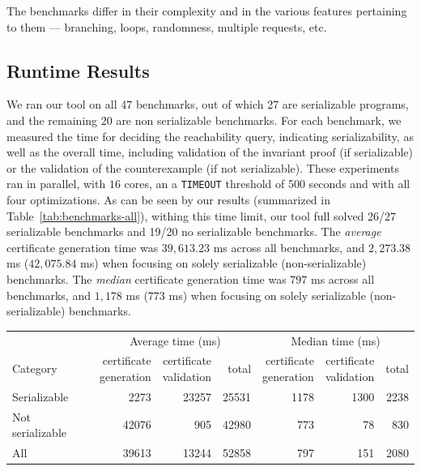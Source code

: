 The benchmarks differ in their complexity and in the various features pertaining to them --- branching, loops, randomness, multiple requests, etc. 
%

\subsection{Runtime Results}
We ran our tool on all 47 benchmarks, out of which 27 are serializable programs, and the remaining 20 are non serializable benchmarks. 
For each benchmark, we measured the time for deciding the reachability query, indicating serializability, as well as the overall time, including validation of the invariant proof (if serializable) or the validation of the counterexample (if not serializable). These experiments ran in parallel, with $16$ cores, an a \texttt{TIMEOUT} threshold of 500 seconds and with all four optimizations. As can be seen by our results (summarized in Table~\ref{tab:benchmarks-all}), withing this time limit, our tool full solved 26/27 serializable benchmarks 
and 19/20 no serializable benchmarks. 
%
The \textit{average} certificate generation time was $39{,}613.23$ ms across all benchmarks, and $2{,}273.38$ ms ($42{,}075.84$ ms) when focusing on solely serializable (non-serializable) benchmarks.
%
The \textit{median} certificate generation time was $797$ ms across all benchmarks, and $1{,}178$ ms ($773$ ms) when focusing on solely serializable (non-serializable) benchmarks.

\begin{table}[H]
	\centering
	\begin{tabular}{lrrrrrr}
		\toprule
		& \multicolumn{3}{c}{Average time (ms)} & \multicolumn{3}{c}{Median time (ms)} \\
		\cmidrule(lr){2-4} \cmidrule(lr){5-7}
		Category
		& \shortstack{certificate\\generation}
		& \shortstack{certificate\\validation}
		& total
		& \shortstack{certificate\\generation}
		& \shortstack{certificate\\validation}
		& total \\
		\midrule
		Serializable      &   2273 &  23257 &  25531 &  1178 &  1300 &  2238 \\
		Not serializable  &  42076 &    905 &  42980 &   773 &    78 &   830 \\
		All               &  39613 &  13244 &  52858 &   797 &   151 &  2080 \\
		\bottomrule
	\end{tabular}
\end{table}

